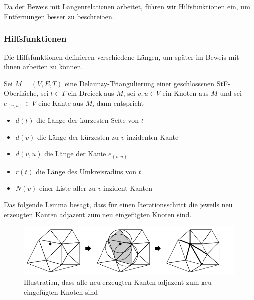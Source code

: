 Da der Beweis mit  Längenrelationen arbeitet, führen wir Hilfsfunktionen ein, um Entfernungen besser zu beschreiben. 

\subsubsection{Hilfsfunktionen}
Die Hilfsfunktionen definieren verschiedene Längen, um später im Beweis mit ihnen arbeiten zu können.
\begin{definition}
Sei $M = (V,E,T)$ eine Delaunay-Triangulierung  einer geschlossenen StF-Oberfläche, sei $t \in T$ ein Dreieck aus $M$, sei $v,u \in V$ ein Knoten aus $M$ und sei $e_{(v,u)} \in V$ eine Kante aus $M$,  dann entspricht
\begin{itemize}
    \item $d(t)$ die Länge der kürzesten Seite von $t$
    \item $d(v)$ die Länge der kürzesten zu $v$ inzidenten Kante
    \item $d(v,u)$ die Länge der Kante  $e_{(v,u)}$
    \item $r(t)$ die Länge des Umkreisradius von $t$
    \item $N(v)$ einer Liste aller zu $v$ inzident Kanten
\end{itemize}


\end{definition}



Das folgende Lemma besagt, dass für einen Iterationsschritt die jeweils neu erzeugten Kanten adjazent zum neu eingefügten Knoten sind.



\begin{figure}[h!]
    \centering
    \includegraphics[width=5in]{images/adejazent.png}
    \caption{Illustration, dass alle neu erzeugten Kanten adjazent zum neu eingefügten Knoten sind~\cite{shewchuk:1997:delaunay} }%
    \label{fig:adejazent}
\end{figure}
 


